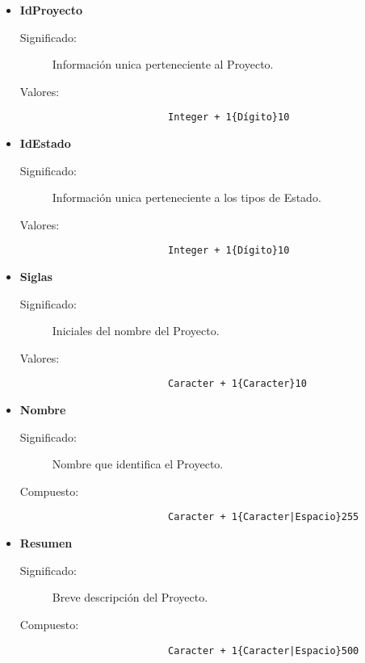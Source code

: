 \begin{itemize}
	\item	\textbf{IdProyecto}
		\begin{description}
			\item[Significado:]Información unica perteneciente al Proyecto.
			\item[Valores:]{\begin{lstlisting}
					Integer + 1{Dígito}10\end{lstlisting}}
		\end{description}

	\item	\textbf{IdEstado}
		\begin{description}
			\item[Significado:]Información unica perteneciente a los tipos de Estado.
			\item[Valores:]{\begin{lstlisting}
					Integer + 1{Dígito}10\end{lstlisting}}
		\end{description}

	\item	\textbf{Siglas}
		\begin{description}
			\item[Significado:]Iniciales del nombre del Proyecto.
			\item[Valores:]{\begin{lstlisting}
					Caracter + 1{Caracter}10\end{lstlisting}}
		\end{description}

	\item	\textbf{Nombre}
		\begin{description}
			\item[Significado:]Nombre que identifica el Proyecto.
			\item[Compuesto:]{\begin{lstlisting}
					Caracter + 1{Caracter|Espacio}255\end{lstlisting}}
		\end{description}

	\item	\textbf{Resumen}
		\begin{description}
			\item[Significado:]Breve descripción del Proyecto.
			\item[Compuesto:]{\begin{lstlisting}
					Caracter + 1{Caracter|Espacio}500\end{lstlisting}}
		\end{description}


\end{itemize}
